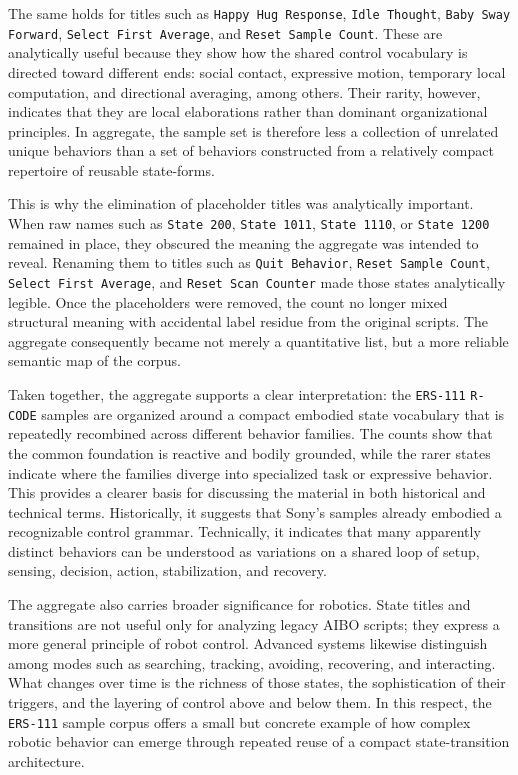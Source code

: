 \documentclass[11pt]{article}
\begin{document}
The same holds for titles such as \texttt{Happy Hug Response},
\texttt{Idle Thought}, \texttt{Baby Sway Forward},
\texttt{Select First Average}, and \texttt{Reset Sample Count}. These
are analytically useful because they show how the shared control
vocabulary is directed toward different ends: social contact,
expressive motion, temporary local computation, and directional
averaging, among others. Their rarity, however, indicates that they are
local elaborations rather than dominant organizational principles. In
aggregate, the sample set is therefore less a collection of unrelated
unique behaviors than a set of behaviors constructed from a relatively
compact repertoire of reusable state-forms.

This is why the elimination of placeholder titles was analytically
important. When raw names such as \texttt{State 200},
\texttt{State 1011}, \texttt{State 1110}, or \texttt{State 1200}
remained in place, they obscured the meaning the aggregate was intended
to reveal. Renaming them to titles such as \texttt{Quit Behavior},
\texttt{Reset Sample Count}, \texttt{Select First Average}, and
\texttt{Reset Scan Counter} made those states analytically legible.
Once the placeholders were removed, the count no longer mixed
structural meaning with accidental label residue from the original
scripts. The aggregate consequently became not merely a quantitative
list, but a more reliable semantic map of the corpus.

Taken together, the aggregate supports a clear interpretation: the
\texttt{ERS-111} \texttt{R-CODE} samples are organized around a compact
embodied state vocabulary that is repeatedly recombined across
different behavior families. The counts show that the common
foundation is reactive and bodily grounded, while the rarer states
indicate where the families diverge into specialized task or expressive
behavior. This provides a clearer basis for discussing the material in
both historical and technical terms. Historically, it suggests that
Sony's samples already embodied a recognizable control grammar.
Technically, it indicates that many apparently distinct behaviors can
be understood as variations on a shared loop of setup, sensing,
decision, action, stabilization, and recovery.

The aggregate also carries broader significance for robotics. State
titles and transitions are not useful only for analyzing legacy AIBO
scripts; they express a more general principle of robot control.
Advanced systems likewise distinguish among modes such as searching,
tracking, avoiding, recovering, and interacting. What changes over time
is the richness of those states, the sophistication of their triggers,
and the layering of control above and below them. In this respect, the
\texttt{ERS-111} sample corpus offers a small but concrete example of
how complex robotic behavior can emerge through repeated reuse of a
compact state-transition architecture.
\end{document}
